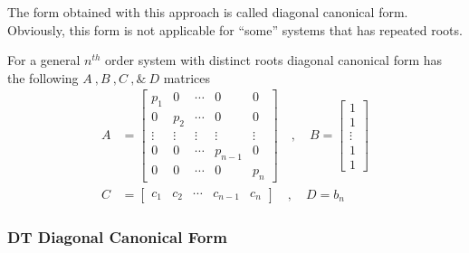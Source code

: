 \documentclass[twoside]{article}
\begin{document}
The form obtained with this approach is called
diagonal canonical form. Obviously, this form is
not applicable for ``some'' systems that has repeated roots.

For a general $n^{th}$ order system with distinct
roots diagonal canonical form has the following 
$A \ ,  B \ ,  C \ , \& \ D$ matrices
%
\begin{align*}
A &= \left[ \begin{array}{ccccc} p_1 & 0 & \cdots & 0 & 0
              \\ 0 & p_2 & \cdots & 0 & 0
\\ \vdots & \vdots & \vdots & \vdots & \vdots
\\ 0 & 0 & \cdots & p_{n-1} & 0
    \\ 0 & 0 & \cdots & 0 & p_n \end{array} \right]
\quad , \quad 
B = \left[ \begin{array}{c} 1 \\ 1 \\ \vdots \\ 1 \\  1
\end{array} \right]
\\ C &= \left[ \begin{array}{ccccc} c_1 & c_2 & \cdots &  c_{n-1} & c_n \end{array} \right]
\quad , \quad
D = b_n
\end{align*}


\subsubsection{DT Diagonal Canonical Form}
\end{document}
